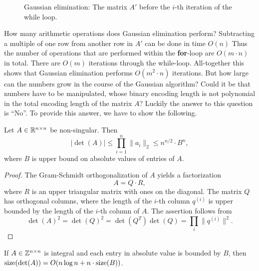 \begin{figure}  
   \centering
  	   
  \caption{Gaussian elimination: The matrix $A'$ before  the $i$-th iteration of the while loop. \label{fig:9}}
\end{figure}


How many arithmetic operations does Gaussian elimination perform? Subtracting a multiple of one row from another row in $A'$ can be done in time $O(n)$ Thus the number of operations that are performed within the {\bf for}-loop are $O(m ⋅n)$ in total. There are $O(m)$ iterations through the while-loop. All-together this shows that Gaussian elimination performs $O(m^2 ⋅n)$ iterations. But how large can the numbers grow in the course of the Gaussian algorithm? Could it be that numbers have to be manipulated, whose binary encoding length is not polynomial in the total encoding length of the matrix $A$? Luckily the answer to this question is ``No''. To provide this answer, we have to show the following. 


\begin{theorem} 
  Let $A \in \mathbb{R}^{n \times n}$ be non-singular. Then 
  \begin{displaymath}
    |\det(A)| \leq \prod_{i=1}^n \|a_i\|_2 \leq n^{n/2} \cdot B^n, 
  \end{displaymath}
  where $B$ is upper bound on absolute values of entries of $A$.
\end{theorem}

\begin{proof}
  The Gram-Schmidt orthogonalization of $A$ yields a factorization 
  \begin{displaymath}
    A = Q \cdot R,
  \end{displaymath}
where $R$ is an upper triangular matrix with ones on the diagonal. The matrix $Q$ has orthogonal columns, where the length of the $i$-th column $q^{(i)}$ is upper bounded by the length of the $i$-th column of $A$. 
The assertion follows from 
\begin{displaymath}
  \det(A)^2 = \det(Q)^2 = \det(Q^T) \det(Q) = \prod_i \|q^{(i)}\|^2. 
\end{displaymath}
\end{proof}



\begin{corollary}
\label{co:11}
  If $A\in \mathbb{Z}^{n\times n}$ is integral and each entry in absolute
  value is bounded by $B$, then $\operatorname{size}(\det(A)) = O(n \log n+ n \cdot
  \operatorname{size}(B))$.
\end{corollary}
% 


